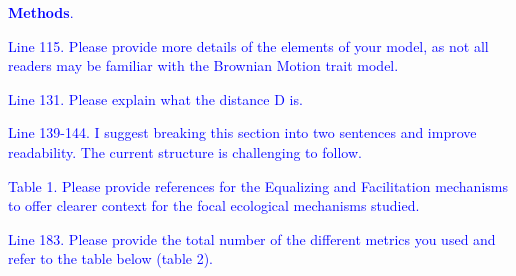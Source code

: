 \documentclass[
]{article}
\begin{document}

\textcolor{blue}{\textbf{Methods}.}

\textcolor{blue}{Line 115. Please provide more details of the elements of your model, as not all readers may be familiar with the Brownian Motion trait model.}

\textcolor{blue}{Line 131. Please explain what the distance D is.}

\textcolor{blue}{Line 139-144. I suggest breaking this section into two sentences and improve readability.
The current structure is challenging to follow.}

\textcolor{blue}{Table 1. Please provide references for the Equalizing and Facilitation mechanisms to offer clearer context for the focal ecological mechanisms studied.}

\textcolor{blue}{Line 183. Please provide the total number of the different metrics you used and refer to the table below (table 2).}
\end{document}
